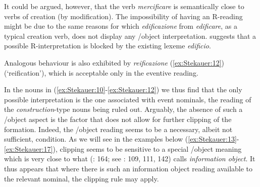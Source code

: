 \documentclass[output=paper]{langsci/langscibook}
\begin{document}
It could be argued, however, that the verb \emph{mercificare} is
semantically close to verbs of creation (by modification). The
impossibility of having an R-reading might be due to the same reasons for
which \emph{edificazione} from \emph{edificare}, as a typical creation
verb, does not display any /object interpretation. %
\citet[189]{Melloni2011} %
%
suggests that a possible R-interpretation is blocked by the
existing lexeme \emph{edificio}.

Analogous behaviour is also exhibited by \emph{reificazione} (\ref{ex:Stekauer:12})
(`reification'), which is acceptable only in the eventive reading.

\largerpage
\begin{exe}
\ex\label{ex:Stekauer:12}
\begin{xlist}
\end{xlist}
\end{exe}

In the nouns in (\ref{ex:Stekauer:10}-\ref{ex:Stekauer:12}) we thus find that the only possible
interpretation is the one associated with event nominals,  the  reading of the \emph{construction}-type nouns being ruled
out. Arguably,
the absence of such a /object aspect is the factor that does not
allow for further clipping of the formation. Indeed, the /object
reading seems to be a necessary, albeit not sufficient, condition. As we
will see in the examples below (\ref{ex:Stekauer:13}-\ref{ex:Stekauer:17}), clipping seems to be sensitive
to a special /object meaning which is very close to what
%
\citeauthor{pustejovsky91} (\citeyear{pustejovsky91}: 164; see \citealt{Melloni2011}: 109, 111, 142) %
%
calls
\emph{information object}. It thus appears that where there is such an
information object reading available to the relevant nominal, the
clipping rule may apply.
\end{document}
